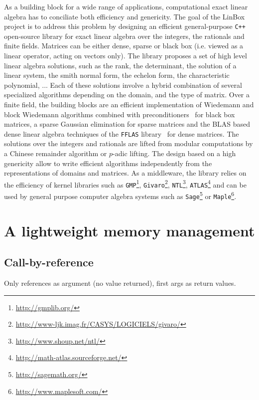 \documentclass[runningheads,a4paper]{llncs}
\newcommand{\linbox}{{\sc LinBox}\xspace}
\begin{document}
As a building block for a wide range of applications, computational exact linear
algebra has to conciliate both efficiency and genericity. The goal of the 
\linbox project is to address this problem by designing an efficient general-purpose
\texttt{C++} open-source library for exact linear algebra over the integers, the
rationals and finite fields. 
Matrices can be either dense, sparse or black box (i.e. viewed as a linear
operator, acting on vectors only). The library proposes a set of high level
linear algebra solutions, such as the rank, the determinant, the solution of a
linear system, the smith normal form, the echelon form, the characteristic
polynomial, ... Each of these solutions involve a hybrid combination of several specialized
algorithms depending on the domain, and the type of matrix. Over a finite field,
the building blocks are an efficient implementation of Wiedemann and block
Wiedemann algorithms combined with preconditioners~\cite{CEKSTV:2002:EP} for
black box matrices, a sparse Gaussian elimination for sparse matrices and the
BLAS based dense linear algebra techniques of the \texttt{FFLAS}
library~\cite{DGP:2008:dlaff} for dense matrices. The solutions over the integers
and rationals are lifted from modular computations by a Chinese remainder
algorithm or $p$-adic lifting.
The design based on a high genericity allow to write efficient algorithms  independently from the
representations of domains and matrices. As a middleware, the library relies on the
efficiency of kernel libraries such as  \texttt{GMP}\footnote{\url{http://gmplib.org/}},
\texttt{Givaro}\footnote{\url{http://www-ljk.imag.fr/CASYS/LOGICIELS/givaro/}},
\texttt{NTL}\footnote{\url{http://www.shoup.net/ntl/}},
\texttt{ATLAS}\footnote{\url{http://math-atlas.sourceforge.net/}} and can be used by general
purpose computer algebra systems such as \texttt{Sage}\footnote{\url{http://sagemath.org/}} or \texttt{Maple}\footnote{\url{http://www.maplesoft.com/}}. 

\section{A lightweight memory management}

\subsection{Call-by-reference}

Only references as argument (no value returned), first args as return
values.
\end{document}
